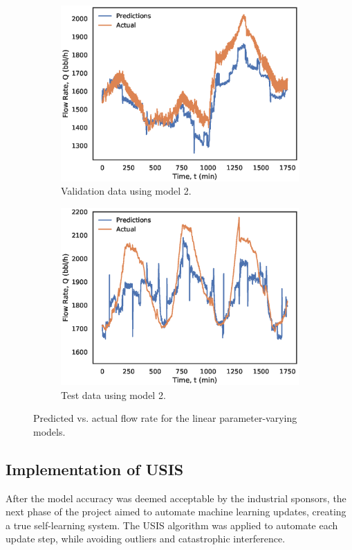 \begin{figure}[h]
\begin{subfigure}[b]{0.48\textwidth}
         \includegraphics[width=\textwidth]{images/suncor/08cluster2_valid.eps}
         \caption{Validation data using model 2.}
         \label{fig:02cluster2_valid}
     \end{subfigure}
     \begin{subfigure}[b]{0.48\textwidth}
         \includegraphics[width=\textwidth]{images/suncor/08cluster2_test.eps}
         \caption{Test data using model 2.}
         \label{fig:02cluster2_test}
     \end{subfigure}
        \caption{Predicted vs. actual flow rate for the linear parameter-varying models.}
        \label{fig:02LPVPlots}
\end{figure}

\subsection{Implementation of USIS}
After the model accuracy was deemed acceptable by the industrial sponsors, the next phase of the project aimed to automate machine learning updates, creating a true self-learning system.  The USIS algorithm was applied to automate each update step, while avoiding outliers and catastrophic interference. 

